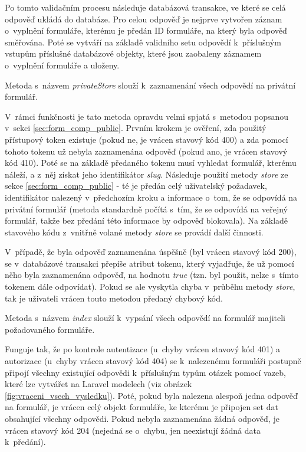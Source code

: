 			Po tomto validačním procesu následuje databázová transakce, ve které se celá odpověď ukládá do databáze. Pro celou odpověď je nejprve vytvořen záznam o~vyplnění formuláře, kterému je předán ID formuláře, na který byla odpověď směřována. Poté se vytváří na základě validního setu odpovědí k~příslušným vstupům příslušné databázové objekty, které jsou zaobaleny záznamem o~vyplnění formuláře a uloženy.
			
			\label{sec:form_comp_private}
			Metoda s~názvem \textit{privateStore} slouží k~zaznamenání všech odpovědí na privátní formulář.
			
			V~rámci funkčnosti je tato metoda opravdu velmi spjatá s~metodou popsanou v~sekci \ref{sec:form_comp_public}. Prvním krokem je ověření, zda použitý přístupový token existuje (pokud ne, je vrácen stavový kód 400) a zda pomocí tohoto tokenu už nebyla zaznamenána odpověď (pokud ano, je vrácen stavový kód 410). Poté se na základě předaného tokenu musí vyhledat formulář, kterému náleží, a z~něj získat jeho identifikátor \textit{slug}. Následuje použití metody \textit{store} ze sekce \ref{sec:form_comp_public} - té je předán celý uživatelský požadavek, identifikátor nalezený v~předchozím kroku a informace o~tom, že se odpovídá na privátní formulář (metoda standardně počítá s~tím, že se odpovídá na veřejný formulář, takže bez předání této informace by odpověď blokovala). Na základě stavového kódu z~vnitřně volané metody \textit{store} se provádí další činnosti. 
			
			V~případě, že byla odpověď zaznamenána úspěšně (byl vrácen stavový kód 200), se v~databázové transakci přepíše atribut tokenu, který vyjadřuje, že už pomocí něho byla zaznamenána odpověď, na hodnotu \textit{true} (tzn. byl použit, nelze s~tímto tokenem dále odpovídat). Pokud se ale vyskytla chyba v~průběhu metody \textit{store}, tak je uživateli vrácen touto metodou předaný chybový kód.
			
			\label{sec:form_comp_private_index}
			Metoda s~názvem \textit{index} slouží k~vypsání všech odpovědí na formulář majiteli požadovaného formuláře.
			
			Funguje tak, že po kontrole autentizace (u~chyby vrácen stavový kód 401) a autorizace (u~chyby vrácen stavový kód 404) se k~nalezenému formuláři postupně připojí všechny existující odpovědi k~příslušným typům otázek pomocí vazeb, které lze vytvářet na Laravel modelech (viz obrázek \ref{fig:vraceni_vsech_vysledku}). Poté, pokud byla nalezena alespoň jedna odpověď na formulář, je vrácen celý objekt formuláře, ke kterému je připojen set dat obsahující všechny odpovědi. Pokud nebyla zaznamenána žádná odpověď, je vrácen stavový kód 204 (nejedná se o~chybu, jen neexistují žádná data k~předání).
			
